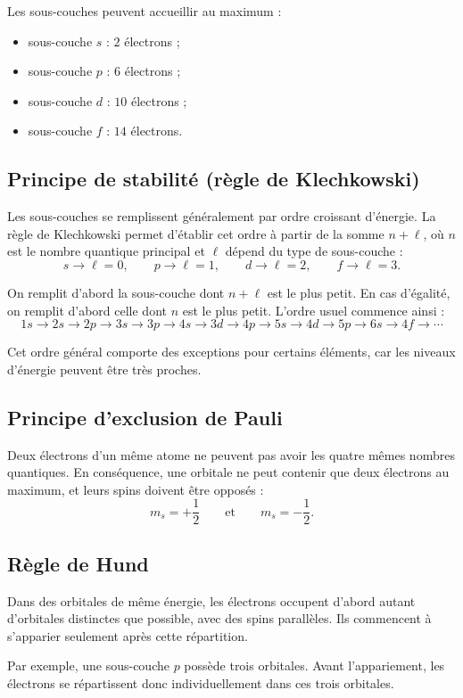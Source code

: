 \documentclass[a4paper,11pt]{article}
\begin{document}
Les sous-couches peuvent accueillir au maximum :
\begin{itemize}[nosep]
    \item sous-couche \(s\) : \(2\) électrons ;
    \item sous-couche \(p\) : \(6\) électrons ;
    \item sous-couche \(d\) : \(10\) électrons ;
    \item sous-couche \(f\) : \(14\) électrons.
\end{itemize}

\subsection{Principe de stabilité (règle de Klechkowski)}

Les sous-couches se remplissent généralement par ordre croissant d'énergie.
La règle de Klechkowski permet d'établir cet ordre à partir de la somme
\(n+\ell\), où \(n\) est le nombre quantique principal et \(\ell\) dépend du
type de sous-couche :
\[
    s \rightarrow \ell=0,\qquad
    p \rightarrow \ell=1,\qquad
    d \rightarrow \ell=2,\qquad
    f \rightarrow \ell=3.
\]

On remplit d'abord la sous-couche dont \(n+\ell\) est le plus petit. En cas
d'égalité, on remplit d'abord celle dont \(n\) est le plus petit. L'ordre
usuel commence ainsi :
\[
    1s \rightarrow 2s \rightarrow 2p \rightarrow 3s \rightarrow 3p
    \rightarrow 4s \rightarrow 3d \rightarrow 4p \rightarrow 5s
    \rightarrow 4d \rightarrow 5p \rightarrow 6s \rightarrow 4f
    \rightarrow \cdots
\]

Cet ordre général comporte des exceptions pour certains éléments, car les
niveaux d'énergie peuvent être très proches.

\subsection{Principe d'exclusion de Pauli}

Deux électrons d'un même atome ne peuvent pas avoir les quatre mêmes nombres
quantiques. En conséquence, une orbitale ne peut contenir que deux électrons
au maximum, et leurs spins doivent être opposés :
\[
    m_s=+\frac{1}{2}
    \qquad\text{et}\qquad
    m_s=-\frac{1}{2}.
\]

\subsection{Règle de Hund}

Dans des orbitales de même énergie, les électrons occupent d'abord autant
d'orbitales distinctes que possible, avec des spins parallèles. Ils commencent
à s'apparier seulement après cette répartition.

Par exemple, une sous-couche \(p\) possède trois orbitales. Avant
l'appariement, les électrons se répartissent donc individuellement dans ces
trois orbitales.
\end{document}
